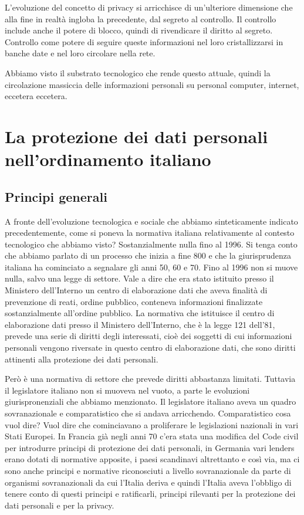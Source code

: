 L'evoluzione del concetto di privacy si arricchisce di un'ulteriore dimensione che alla fine in realtà ingloba la precedente, dal segreto al controllo. Il controllo include anche il potere di blocco, quindi di rivendicare il diritto al segreto. Controllo come potere di seguire queste informazioni nel loro cristallizzarsi in banche date e nel loro circolare nella rete. 

Abbiamo visto il substrato tecnologico che rende questo attuale, quindi la circolazione massiccia delle informazioni personali su personal computer, internet, eccetera eccetera. 

\section{La protezione dei dati personali nell'ordinamento italiano}
\subsection{Principi generali}

A fronte dell'evoluzione tecnologica e sociale che abbiamo sinteticamente indicato precedentemente, come si poneva la normativa italiana relativamente al contesto tecnologico che abbiamo visto? Sostanzialmente nulla fino al 1996. Si tenga conto che abbiamo parlato di un processo che inizia a fine 800 e che la giurisprudenza italiana ha cominciato a segnalare gli anni 50, 60 e 70. Fino al 1996 non si muove nulla, salvo una legge di settore. Vale a dire che era stato istituito presso il Ministero dell'Interno un centro di elaborazione dati che aveva finalità di prevenzione di reati, ordine pubblico, conteneva informazioni finalizzate sostanzialmente all'ordine pubblico. La normativa che istituisce il centro di elaborazione dati presso il Ministero dell'Interno, che è la legge 121 dell'81, prevede una serie di diritti degli interessati, cioè dei soggetti di cui informazioni personali vengono riversate in questo centro di elaborazione dati, che sono diritti  attinenti alla protezione dei dati personali. 

Però è una normativa di settore che prevede diritti abbastanza limitati. Tuttavia il legislatore italiano non si muoveva nel vuoto, a parte le evoluzioni giurispronenziali che abbiamo menzionato. Il legislatore italiano aveva un quadro sovranazionale e comparatistico che si andava arricchendo. Comparatistico cosa vuol dire? Vuol dire che cominciavano a proliferare le legislazioni nazionali in vari Stati Europei. In Francia già negli anni 70 c'era stata una modifica del Code civil per introdurre principi di protezione dei dati personali, in Germania vari lenders erano dotati di normative apposite, i paesi scandinavi altrettanto e così via, ma ci sono anche principi e normative riconosciuti a livello sovranazionale da parte di organismi sovranazionali da cui l'Italia deriva e quindi l'Italia aveva l'obbligo di tenere conto di questi principi e ratificarli, principi rilevanti per la protezione dei dati personali e per la privacy. 

